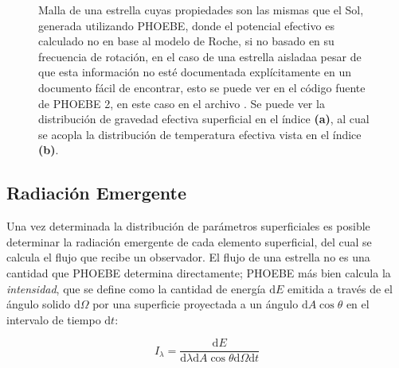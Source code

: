 \begin{figure}[!ht]
	\centering

	\caption[Distribución de gravedad superficial y temperatura efectiva
	local.]{Malla de una estrella cuyas propiedades son las mismas que el Sol,
	generada utilizando PHOEBE, donde el potencial efectivo es calculado no en
	base al modelo de Roche, si no basado en su frecuencia de rotación, en el
	caso de una estrella aislada\textemdash a pesar de que esta información no
	esté documentada explícitamente en un documento fácil de encontrar, esto se
	puede ver en el código fuente de PHOEBE 2, en este caso en el archivo
	\href{https://github.com/phoebe-project/phoebe2/blob/master/phoebe/distortions/rotstar.py}{}.
	Se puede ver la distribución de gravedad efectiva superficial en el índice
	\textbf{(a)}, al cual se acopla la distribución de temperatura efectiva
	vista en el índice \textbf{(b)}.}
	\label{figuraMallaPhoebeTeffLogg}
\end{figure}

\newpage

\subsection{Radiación Emergente}

Una vez determinada la distribución de parámetros superficiales es posible
determinar la radiación emergente de cada elemento superficial, del cual se
calcula el flujo que recibe un observador. El flujo de una estrella no es una
cantidad que PHOEBE determina directamente; PHOEBE más bien calcula la
\textit{intensidad}, que se define como la cantidad de energía $\mathrm{d}E$
emitida a través de el ángulo solido $\mathrm{d}\Omega$ por una superficie
proyectada a un ángulo $\mathrm{d}A \cos{\theta}$ en el intervalo de tiempo
$\mathrm{d}t$:

\begin{eqfloat}[!ht]
	\centering
	\begin{equation}
		I_{\lambda} = \frac{\textrm{d}E}{\textrm{d}\lambda \textrm{d}A \cos{\theta} \textrm{d}\Omega \textrm{d}t}
	\end{equation}
	\blankcaption
	\label{ecuacionIntensidadMonocromatica}
\end{eqfloat}

